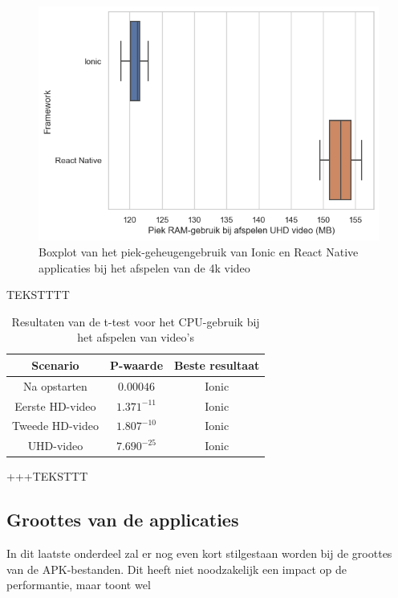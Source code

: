 \begin{figure}
  \centering
  \includegraphics[width=0.7\linewidth]{img/ram/4k}
  \caption{Boxplot van het piek-geheugengebruik van Ionic en React Native applicaties bij het afspelen van de 4k video}
  \label{fig:Boxplot van het piek-geheugengebruik van Ionic en React Native applicaties bij het afspelen van de 4k video}
\end{figure}

TEKSTTTT

\begin{table}[htbp]
  \centering
  \footnotesize
  \begin{tabular}{|c|c|c|}
      \hline
      \textbf{Scenario} & \textbf{P-waarde} & \textbf{Beste resultaat} \\
      \hline
      Na opstarten & \(0.00046\) & Ionic \\
      \hline
      Eerste HD-video & \(1.371^{-11}\) & Ionic \\
      \hline
      Tweede HD-video & \(1.807^{-10}\) & Ionic \\
      \hline
      UHD-video & \(7.690^{-25}\) & Ionic \\
      \hline
  \end{tabular}
  \caption{Resultaten van de t-test voor het CPU-gebruik bij het afspelen van video's}
  \label{tab:cpu_ttest}
\end{table}

+++TEKSTTT


\subsection{Groottes van de applicaties}
\label{subsec:groottes-van-de-applicaties}

In dit laatste onderdeel zal er nog even kort stilgestaan worden bij de groottes van de APK-bestanden. Dit heeft niet noodzakelijk een impact op de performantie, maar toont wel 

